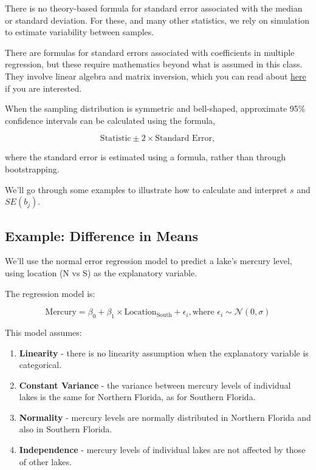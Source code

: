 \documentclass[
  letterpaper,
  DIV=11,
  numbers=noendperiod]{scrreprt}
\begin{document}
There is no theory-based formula for standard error associated with the
median or standard deviation. For these, and many other statistics, we
rely on simulation to estimate variability between samples.

There are formulas for standard errors associated with coefficients in
multiple regression, but these require mathematics beyond what is
assumed in this class. They involve linear algebra and matrix inversion,
which you can read about
\href{https://web.stanford.edu/~mrosenfe/soc_meth_proj3/matrix_OLS_NYU_notes.pdf}{here}
if you are interested.

When the sampling distribution is symmetric and bell-shaped, approximate
95\% confidence intervals can be calculated using the formula,

\[
\text{Statistic} \pm 2\times \text{Standard Error}, 
\]

where the standard error is estimated using a formula, rather than
through bootstrapping.

We'll go through some examples to illustrate how to calculate and
interpret \(s\) and \(SE(b_j)\).

\subsection{Example: Difference in
Means}\label{example-difference-in-means}

We'll use the normal error regression model to predict a lake's mercury
level, using location (N vs S) as the explanatory variable.

The regression model is:

\[
\text{Mercury} = \beta_0 +\beta_1 \times\text{Location}_{\text{South}} + \epsilon_i, \text{where } \epsilon_i\sim\mathcal{N}(0, \sigma) 
\]

This model assumes:

\begin{enumerate}
\def\labelenumi{\arabic{enumi}.}
\item
  \textbf{Linearity} - there is no linearity assumption when the
  explanatory variable is categorical.
\item
  \textbf{Constant Variance} - the variance between mercury levels of
  individual lakes is the same for Northern Florida, as for Southern
  Florida.
\item
  \textbf{Normality} - mercury levels are normally distributed in
  Northern Florida and also in Southern Florida.
\item
  \textbf{Independence} - mercury levels of individual lakes are not
  affected by those of other lakes.
\end{enumerate}
\end{document}
